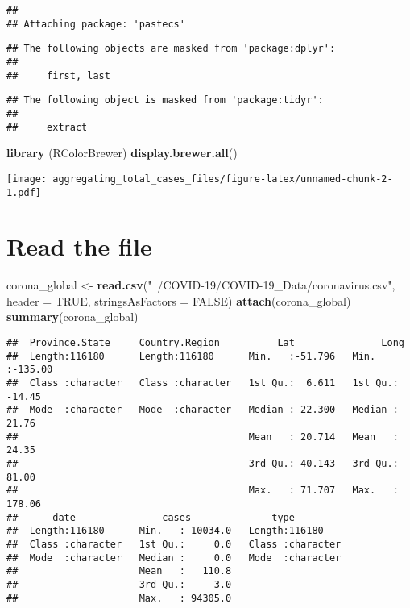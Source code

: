 \documentclass[
]{article}
\newenvironment{Shaded}{\begin{snugshade}}{\end{snugshade}}
\newcommand{\DataTypeTok}[1]{\textcolor[rgb]{0.13,0.29,0.53}{#1}}
\newcommand{\KeywordTok}[1]{\textcolor[rgb]{0.13,0.29,0.53}{\textbf{#1}}}
\newcommand{\NormalTok}[1]{#1}
\newcommand{\OtherTok}[1]{\textcolor[rgb]{0.56,0.35,0.01}{#1}}
\newcommand{\StringTok}[1]{\textcolor[rgb]{0.31,0.60,0.02}{#1}}
\begin{document}
\begin{verbatim}
## 
## Attaching package: 'pastecs'
\end{verbatim}

\begin{verbatim}
## The following objects are masked from 'package:dplyr':
## 
##     first, last
\end{verbatim}

\begin{verbatim}
## The following object is masked from 'package:tidyr':
## 
##     extract
\end{verbatim}

\begin{Shaded}
\begin{Highlighting}[]
\KeywordTok{library}\NormalTok{ (RColorBrewer)}
\KeywordTok{display.brewer.all}\NormalTok{()}
\end{Highlighting}
\end{Shaded}

\texttt{[image: aggregating\_total\_cases\_files/figure-latex/unnamed-chunk-2-1.pdf]}

\hypertarget{read-the-file}{%
\section{Read the file}\label{read-the-file}}

\begin{Shaded}
\begin{Highlighting}[]
\NormalTok{corona_global <-}\StringTok{ }\KeywordTok{read.csv}\NormalTok{(}\StringTok{"~/COVID-19/COVID-19_Data/coronavirus.csv"}\NormalTok{, }
                          \DataTypeTok{header =} \OtherTok{TRUE}\NormalTok{, }\DataTypeTok{stringsAsFactors =} \OtherTok{FALSE}\NormalTok{)}
\KeywordTok{attach}\NormalTok{(corona_global)}
\KeywordTok{summary}\NormalTok{(corona_global)}
\end{Highlighting}
\end{Shaded}

\begin{verbatim}
##  Province.State     Country.Region          Lat               Long        
##  Length:116180      Length:116180      Min.   :-51.796   Min.   :-135.00  
##  Class :character   Class :character   1st Qu.:  6.611   1st Qu.: -14.45  
##  Mode  :character   Mode  :character   Median : 22.300   Median :  21.76  
##                                        Mean   : 20.714   Mean   :  24.35  
##                                        3rd Qu.: 40.143   3rd Qu.:  81.00  
##                                        Max.   : 71.707   Max.   : 178.06  
##      date               cases              type          
##  Length:116180      Min.   :-10034.0   Length:116180     
##  Class :character   1st Qu.:     0.0   Class :character  
##  Mode  :character   Median :     0.0   Mode  :character  
##                     Mean   :   110.8                     
##                     3rd Qu.:     3.0                     
##                     Max.   : 94305.0
\end{verbatim}
\end{document}
